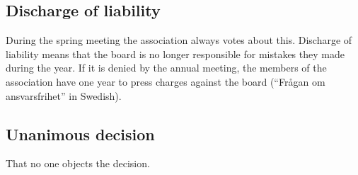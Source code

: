 \subsection*{Discharge of liability}
During the spring meeting the association always votes about this. Discharge of liability means that the board is no longer responsible for mistakes they made during the year. If it is denied by the annual meeting, the members of the association have one year to press charges against the board (“Frågan om ansvarsfrihet” in Swedish).

\subsection*{Unanimous decision}
That no one objects the decision.